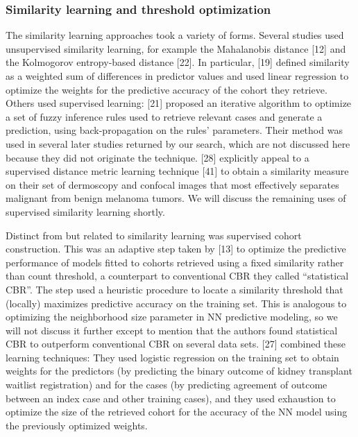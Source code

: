 \documentclass[preprint, 3p,
authoryear]{elsarticle} %
\begin{document}
\hypertarget{similarity-learning-and-threshold-optimization}{%
\subsubsection{Similarity learning and threshold
optimization}\label{similarity-learning-and-threshold-optimization}}

The similarity learning approaches took a variety of forms. Several
studies used unsupervised similarity learning, for example the
Mahalanobis distance {[}12{]} and the Kolmogorov entropy-based distance
{[}22{]}. In particular, {[}19{]} defined similarity as a weighted sum
of differences in predictor values and used linear regression to
optimize the weights for the predictive accuracy of the cohort they
retrieve. Others used supervised learning: {[}21{]} proposed an
iterative algorithm to optimize a set of fuzzy inference rules used to
retrieve relevant cases and generate a prediction, using
back-propagation on the rules' parameters. Their method was used in
several later studies returned by our search, which are not discussed
here because they did not originate the technique. {[}28{]} explicitly
appeal to a supervised distance metric learning technique {[}41{]} to
obtain a similarity measure on their set of dermoscopy and confocal
images that most effectively separates malignant from benign melanoma
tumors. We will discuss the remaining uses of supervised similarity
learning shortly.

Distinct from but related to similarity learning was supervised cohort
construction. This was an adaptive step taken by {[}13{]} to optimize
the predictive performance of models fitted to cohorts retrieved using a
fixed similarity rather than count threshold, a counterpart to
conventional CBR they called ``statistical CBR''. The step used a
heuristic procedure to locate a similarity threshold that (locally)
maximizes predictive accuracy on the training set. This is analogous to
optimizing the neighborhood size parameter in NN predictive modeling, so
we will not discuss it further except to mention that the authors found
statistical CBR to outperform conventional CBR on several data sets.
{[}27{]} combined these learning techniques: They used logistic
regression on the training set to obtain weights for the predictors (by
predicting the binary outcome of kidney transplant waitlist
registration) and for the cases (by predicting agreement of outcome
between an index case and other training cases), and they used
exhaustion to optimize the size of the retrieved cohort for the accuracy
of the NN model using the previously optimized weights.
\end{document}

